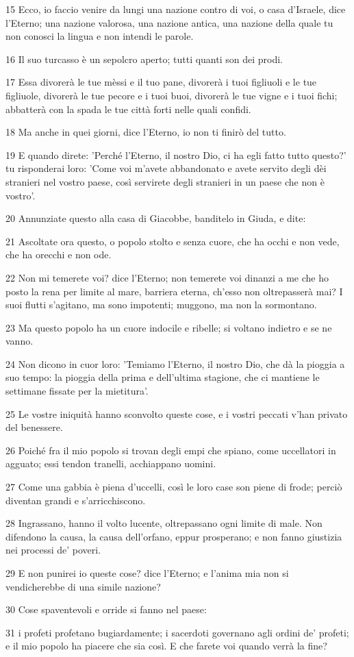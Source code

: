 \par 15 Ecco, io faccio venire da lungi una nazione contro di voi, o casa d'Israele, dice l'Eterno; una nazione valorosa, una nazione antica, una nazione della quale tu non conosci la lingua e non intendi le parole.
\par 16 Il suo turcasso è un sepolcro aperto; tutti quanti son dei prodi.
\par 17 Essa divorerà le tue mèssi e il tuo pane, divorerà i tuoi figliuoli e le tue figliuole, divorerà le tue pecore e i tuoi buoi, divorerà le tue vigne e i tuoi fichi; abbatterà con la spada le tue città forti nelle quali confidi.
\par 18 Ma anche in quei giorni, dice l'Eterno, io non ti finirò del tutto.
\par 19 E quando direte: 'Perché l'Eterno, il nostro Dio, ci ha egli fatto tutto questo?' tu risponderai loro: 'Come voi m'avete abbandonato e avete servito degli dèi stranieri nel vostro paese, così servirete degli stranieri in un paese che non è vostro'.
\par 20 Annunziate questo alla casa di Giacobbe, banditelo in Giuda, e dite:
\par 21 Ascoltate ora questo, o popolo stolto e senza cuore, che ha occhi e non vede, che ha orecchi e non ode.
\par 22 Non mi temerete voi? dice l'Eterno; non temerete voi dinanzi a me che ho posto la rena per limite al mare, barriera eterna, ch'esso non oltrepasserà mai? I suoi flutti s'agitano, ma sono impotenti; muggono, ma non la sormontano.
\par 23 Ma questo popolo ha un cuore indocile e ribelle; si voltano indietro e se ne vanno.
\par 24 Non dicono in cuor loro: 'Temiamo l'Eterno, il nostro Dio, che dà la pioggia a suo tempo: la pioggia della prima e dell'ultima stagione, che ci mantiene le settimane fissate per la mietitura'.
\par 25 Le vostre iniquità hanno sconvolto queste cose, e i vostri peccati v'han privato del benessere.
\par 26 Poiché fra il mio popolo si trovan degli empi che spiano, come uccellatori in agguato; essi tendon tranelli, acchiappano uomini.
\par 27 Come una gabbia è piena d'uccelli, così le loro case son piene di frode; perciò diventan grandi e s'arricchiscono.
\par 28 Ingrassano, hanno il volto lucente, oltrepassano ogni limite di male. Non difendono la causa, la causa dell'orfano, eppur prosperano; e non fanno giustizia nei processi de' poveri.
\par 29 E non punirei io queste cose? dice l'Eterno; e l'anima mia non si vendicherebbe di una simile nazione?
\par 30 Cose spaventevoli e orride si fanno nel paese:
\par 31 i profeti profetano bugiardamente; i sacerdoti governano agli ordini de' profeti; e il mio popolo ha piacere che sia così. E che farete voi quando verrà la fine?

